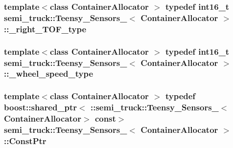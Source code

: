 \subsubsection[{\texorpdfstring{\+\_\+right\+\_\+\+T\+O\+F\+\_\+type}{_right_TOF_type}}]{\setlength{\rightskip}{0pt plus 5cm}template$<$class Container\+Allocator $>$ typedef int16\+\_\+t {\bf semi\+\_\+truck\+::\+Teensy\+\_\+\+Sensors\+\_\+}$<$ Container\+Allocator $>$\+::{\bf \+\_\+right\+\_\+\+T\+O\+F\+\_\+type}}\hypertarget{structsemi__truck_1_1_teensy___sensors___adb98ef7b91b8a2c8346a2b36e1816a61}{}\label{structsemi__truck_1_1_teensy___sensors___adb98ef7b91b8a2c8346a2b36e1816a61}
\subsubsection[{\texorpdfstring{\+\_\+wheel\+\_\+speed\+\_\+type}{_wheel_speed_type}}]{\setlength{\rightskip}{0pt plus 5cm}template$<$class Container\+Allocator $>$ typedef int16\+\_\+t {\bf semi\+\_\+truck\+::\+Teensy\+\_\+\+Sensors\+\_\+}$<$ Container\+Allocator $>$\+::{\bf \+\_\+wheel\+\_\+speed\+\_\+type}}\hypertarget{structsemi__truck_1_1_teensy___sensors___adca9245fde7f0f8121fed20243c9ae1a}{}\label{structsemi__truck_1_1_teensy___sensors___adca9245fde7f0f8121fed20243c9ae1a}
\subsubsection[{\texorpdfstring{Const\+Ptr}{ConstPtr}}]{\setlength{\rightskip}{0pt plus 5cm}template$<$class Container\+Allocator $>$ typedef boost\+::shared\+\_\+ptr$<$ \+::{\bf semi\+\_\+truck\+::\+Teensy\+\_\+\+Sensors\+\_\+}$<$Container\+Allocator$>$ const$>$ {\bf semi\+\_\+truck\+::\+Teensy\+\_\+\+Sensors\+\_\+}$<$ Container\+Allocator $>$\+::{\bf Const\+Ptr}}\hypertarget{structsemi__truck_1_1_teensy___sensors___a1c67c299fc5270cf253a6e5fbafe9ce8}{}\label{structsemi__truck_1_1_teensy___sensors___a1c67c299fc5270cf253a6e5fbafe9ce8}
